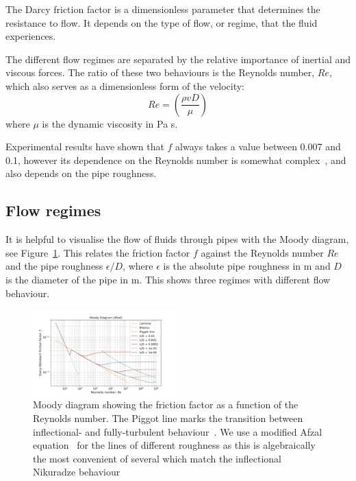 \documentclass[5p]{elsarticle} %
\begin{document}
The Darcy friction factor is a dimensionless parameter that determines the resistance to flow. 
It depends on the type of flow, or regime, that the fluid experiences.

The different flow regimes are separated by the relative importance of inertial and viscous forces.
The ratio of these two behaviours is the Reynolds number, $Re$, which also serves as a dimensionless form of the velocity:
\begin{equation}
\label{eqn:re}
Re =  \left ( \frac{\rho v D}{\mu}\right )
\end{equation}
where $\mu$ is the dynamic viscosity in Pa s.

Experimental results  have shown that $f$ always takes a value between 0.007 and 0.1, however its dependence on the Reynolds number is somewhat complex~\citep{Allen2007}, and also depends on the pipe roughness.

\subsection{Flow regimes}

It is helpful to visualise the flow of fluids through pipes with the Moody diagram, see Figure~\ref{fig:moody}. 
This relates the friction factor $f$ against the Reynolds number $Re$ and the pipe roughness $\epsilon/D$, where $\epsilon$ is the absolute pipe roughness in m and $D$ is the diameter of the pipe in m. 
This shows three regimes with different flow behaviour.

\begin{figure}[ht]
\centering
\includegraphics[width=0.49\textwidth]{moody_afzal.png}
\caption{Moody diagram showing the friction factor as a function of the Reynolds number. The Piggot line
marks the transition between inflectional- and fully-turbulent behaviour~\citep{Moody1944}. We use a modified Afzal equation~\citep{Cerbus2018}  for the lines of different roughness as this is algebraically the most convenient of several which match the inflectional Nikuradze behaviour~\citep{Allen2007,Goldenfeld2006}}
\label{fig:moody}
\end{figure}
\end{document}
